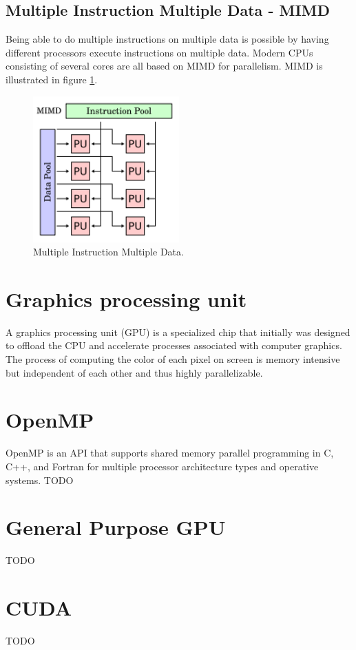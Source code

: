 \subsection*{Multiple Instruction Multiple Data - MIMD}
Being able to do multiple instructions on multiple data is possible by having different processors execute instructions on multiple data. Modern CPUs consisting of several cores are all based on MIMD for parallelism. MIMD is illustrated in figure \ref{MIMD}.
\begin{figure}[h!]
\centering
\includegraphics[width=0.50\textwidth]{parallel/MIMD}
\caption{Multiple Instruction Multiple Data.}
\label{MIMD}
\end{figure}

\section{Graphics processing unit}
A graphics processing unit (GPU) is a specialized chip that initially was designed to offload the CPU and accelerate processes associated with computer graphics. The process of computing the color of each pixel on screen is memory intensive but independent of each other and thus highly parallelizable. 

\section{OpenMP}
OpenMP is an API that supports shared memory parallel programming in C, C++, and Fortran for multiple processor architecture types and operative systems. TODO

\section{General Purpose GPU}
TODO 

\section{CUDA}
TODO
